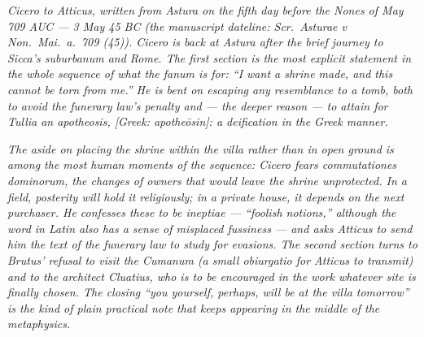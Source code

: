 
\textit{Cicero to Atticus, written from Astura on the
fifth day before the Nones of May 709 AUC --- 3 May
45 BC (the manuscript dateline: \textit{Scr.\ Asturae
v Non.\ Mai.\ a.\ 709 (45)}). Cicero is back at
Astura after the brief journey to Sicca's
suburbanum and Rome. The first section is the most
explicit statement in the whole sequence of what the
\textit{fanum} is for: ``I want a shrine made, and
this cannot be torn from me.'' He is bent on
escaping any resemblance to a tomb, both to avoid the
funerary law's penalty and --- the deeper reason ---
to attain for Tullia an apotheosis,
\textit{[Greek: apothe\=osin]}: a deification in
the Greek manner.}

\textit{The aside on placing the shrine within the
villa rather than in open ground is among the most
human moments of the sequence: Cicero fears
\textit{commutationes dominorum}, the changes of
owners that would leave the shrine unprotected. In a
field, posterity will hold it religiously; in a
private house, it depends on the next purchaser. He
confesses these to be \textit{ineptiae} ---
``foolish notions,'' although the word in Latin
also has a sense of misplaced fussiness --- and asks
Atticus to send him the text of the funerary law to
study for evasions. The second section turns to
Brutus' refusal to visit the Cumanum (a small
\textit{obiurgatio} for Atticus to transmit) and to
the architect Cluatius, who is to be encouraged in
the work whatever site is finally chosen. The closing
``you yourself, perhaps, will be at the villa
tomorrow'' is the kind of plain practical note that
keeps appearing in the middle of the metaphysics.}
